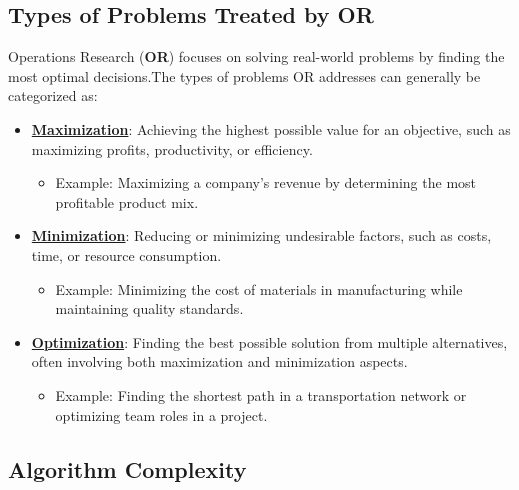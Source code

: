 \subsection{Types of Problems Treated by OR}

\begin{tcolorbox}[title=Types of Problems]
Operations Research (\textbf{OR}) focuses on solving real-world problems by finding the most optimal decisions.The types of problems OR addresses can generally be categorized as:

\begin{itemize}
    \item \textbf{\underline{Maximization}}: Achieving the highest possible value for an objective, such as maximizing profits, productivity, or efficiency. 
        \begin{itemize}
            \item Example: Maximizing a company's revenue by determining the most profitable product mix.
        \end{itemize}
    
    \item \textbf{\underline{Minimization}}: Reducing or minimizing undesirable factors, such as costs, time, or resource consumption.
        \begin{itemize}
            \item Example: Minimizing the cost of materials in manufacturing while maintaining quality standards.
        \end{itemize}

    \item \textbf{\underline{Optimization}}: Finding the best possible solution from multiple alternatives, often involving both maximization and minimization aspects. 
        \begin{itemize}
            \item Example: Finding the shortest path in a transportation network or optimizing team roles in a project.
        \end{itemize}
\end{itemize}
\end{tcolorbox}

\subsection{Algorithm Complexity}


